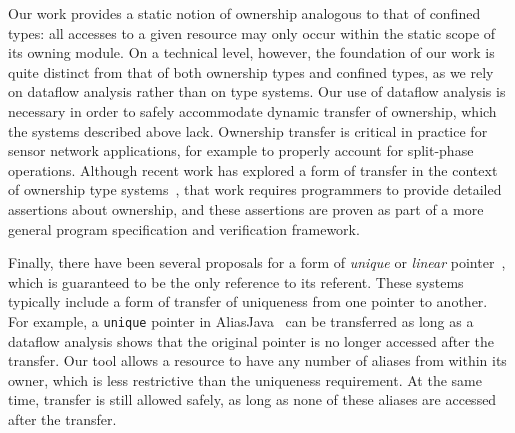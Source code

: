 Our work provides a static notion of ownership analogous to that of
confined types:  all accesses
to a given resource may only occur within the static scope of its
owning module.  On a technical level, however, the foundation of our work is
quite distinct from that of both ownership types and confined types,
as we rely on dataflow analysis rather than on type
systems. %
Our use of dataflow analysis is necessary in order to 
safely accommodate dynamic transfer of ownership, which the systems
described above lack.
Ownership transfer is critical in practice for sensor network
applications, for example to properly account for split-phase
operations.  Although recent work has
explored a form of transfer in the context of ownership type
systems~\cite{DBLP:conf/ecoop/BanerjeeN05},
that work requires programmers to provide detailed assertions about
ownership, and these assertions are proven as part of a more
general program specification and verification framework.

Finally, there have been several proposals for a form of 
{\em unique} or {\em linear}
pointer~\cite{Boyland:2001:ABU,aliasjava,Wad90:linear,adoption-focus},
which is guaranteed to be the only reference to its referent.
These systems typically include a form of transfer of uniqueness from
one pointer to another.  For example, a {\tt unique} pointer in
AliasJava~\cite{aliasjava} can be transferred as long as a dataflow
analysis shows that the original pointer is no longer accessed
after the transfer.
Our tool allows a resource to have any number of
aliases from within its owner, which is less restrictive than the
uniqueness requirement.  At the same time, transfer is still allowed
safely, as long as none of these aliases are accessed after the
transfer.
